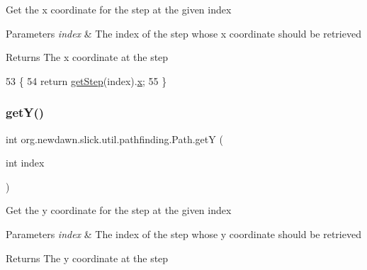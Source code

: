 Get the x coordinate for the step at the given index


\begin{DoxyParams}{Parameters}
{\em index} & The index of the step whose x coordinate should be retrieved \\
\hline
\end{DoxyParams}
\begin{DoxyReturn}{Returns}
The x coordinate at the step 
\end{DoxyReturn}

\begin{DoxyCode}
53                                \{
54         \textcolor{keywordflow}{return} \mbox{\hyperlink{classorg_1_1newdawn_1_1slick_1_1util_1_1pathfinding_1_1_path_acc362a056f4565a8eec1361266eac671}{getStep}}(index).\mbox{\hyperlink{classorg_1_1newdawn_1_1slick_1_1util_1_1pathfinding_1_1_path_1_1_step_a6764404c2d713db22efbeb2ec33cbdc1}{x}};
55     \}
\end{DoxyCode}
\mbox{\label{classorg_1_1newdawn_1_1slick_1_1util_1_1pathfinding_1_1_path_ae3dc411882e33d0d196173964e938f81}} 
\subsubsection{\texorpdfstring{get\+Y()}{getY()}}
{\footnotesize\ttfamily int org.\+newdawn.\+slick.\+util.\+pathfinding.\+Path.\+getY (\begin{DoxyParamCaption}\item[{int}]{index }\end{DoxyParamCaption})\hspace{0.3cm}{\ttfamily [inline]}}

Get the y coordinate for the step at the given index


\begin{DoxyParams}{Parameters}
{\em index} & The index of the step whose y coordinate should be retrieved \\
\hline
\end{DoxyParams}
\begin{DoxyReturn}{Returns}
The y coordinate at the step 
\end{DoxyReturn}

